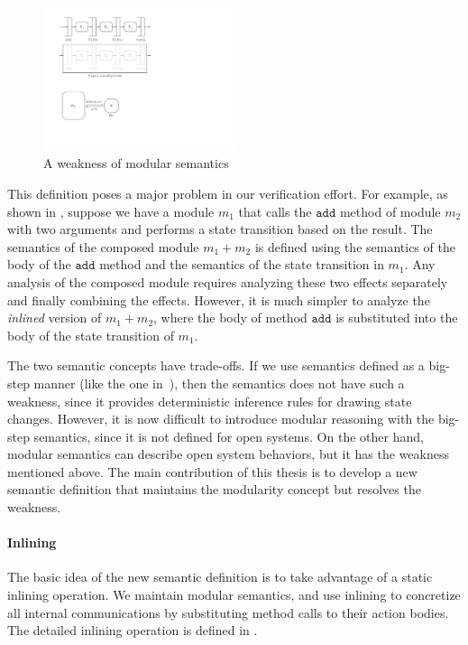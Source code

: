 \begin{figure}[t]
  \centering
  \includegraphics[width=0.5\textwidth]{figures/modsem-weakness.pdf}
  \caption{A weakness of modular semantics}
  \label{ex-modular-semantics-weakness}
\end{figure}

This definition poses a major problem in our verification effort. For
example, as shown in , suppose
we have a module $m_1$ that calls the $\texttt{add}$ method of module
$m_2$ with two arguments and performs a state transition based on the
result. The semantics of the composed module $m_1 + m_2$ is defined
using the semantics of the body of the $\texttt{add}$ method and the
semantics of the state transition in $m_1$. Any analysis of the
composed module requires analyzing these two effects separately and
finally combining the effects. However, it is much simpler to analyze
the \emph{inlined} version of $m_1 + m_2$, where the body of method
$\texttt{add}$ is substituted into the body of the state transition of
$m_1$.

The two semantic concepts have trade-offs. If we use semantics defined
as a big-step manner (like the one in~\cite{nirav-memocode}), then the
semantics does not have such a weakness, since it provides
deterministic inference rules for drawing state changes. However, it
is now difficult to introduce modular reasoning with the big-step
semantics, since it is not defined for open systems. On the other
hand, modular semantics can describe open system behaviors, but it has
the weakness mentioned above. The main contribution of this thesis is
to develop a new semantic definition that maintains the modularity
concept but resolves the weakness.

\paragraph{Inlining}

The basic idea of the new semantic definition is to take advantage of
a static inlining operation. We maintain modular semantics, and use
inlining to concretize all internal communications by substituting
method calls to their action bodies. The detailed inlining operation
is defined in .

